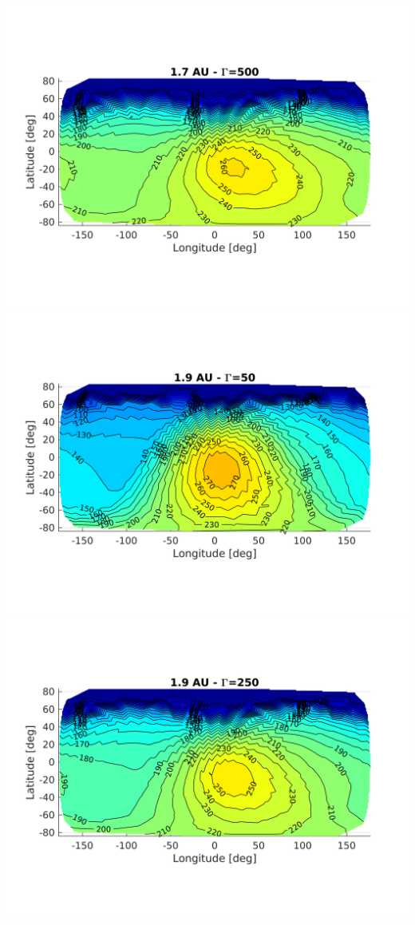 \begin{center}
	\includegraphics[scale=1]{rsc/juventas_d1.7_g500.png}
	\includegraphics[scale=1]{rsc/juventas_d1.9_g50.png}
	\includegraphics[scale=1]{rsc/juventas_d1.9_g250.png}

\end{center}
